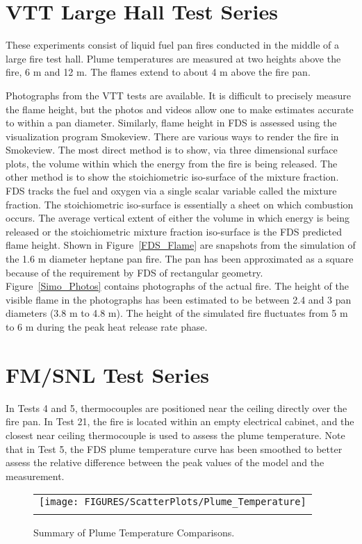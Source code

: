 \clearpage

\section{VTT Large Hall Test Series}

These experiments consist of liquid fuel pan fires conducted in the middle of a large fire test hall.
Plume temperatures are measured at two heights above the fire, 6 m and 12 m.
The flames extend to about 4 m above the fire pan.

Photographs from the VTT tests are available. It is difficult to precisely measure the flame height,
but the photos and videos allow one to make estimates accurate to within a pan diameter.
Similarly, flame height in FDS is assessed using the visualization program Smokeview.
There are various ways to render the fire in Smokeview.  The
most direct method is to show, via three dimensional surface plots, the volume within which the energy from the fire is being released.
The other method is to show the stoichiometric iso-surface of the mixture fraction.
FDS tracks the fuel and oxygen via a single scalar variable called the mixture fraction.
The stoichiometric iso-surface is essentially a sheet on which combustion occurs.  The average vertical extent of either the volume
in which energy is being released or the stoichiometric mixture fraction iso-surface is the FDS predicted flame height.
Shown in Figure~\ref{FDS_Flame} are snapshots from the simulation of the 1.6 m diameter heptane pan fire.
The pan has been approximated as a square because of the requirement by FDS of rectangular geometry.
Figure~\ref{Simo_Photos} contains photographs of the actual fire.
The height of the visible flame in the photographs has been estimated to be between 2.4 and 3 pan diameters (3.8 m to 4.8 m).
The height of the simulated fire fluctuates from 5 m to 6 m during the peak heat release rate phase.


\section{FM/SNL Test Series}

In Tests 4 and 5, thermocouples are positioned near the ceiling directly over the fire pan.
In Test 21, the fire is located within an empty electrical cabinet, and the closest near ceiling thermocouple
is used to assess the plume temperature.  Note that in Test 5, the FDS plume temperature curve has been smoothed
to better assess the relative difference between the peak values of the model and the measurement.




\begin{figure}[p]
\begin{center}
\begin{tabular}{c}
\texttt{[image: FIGURES/ScatterPlots/Plume\_Temperature]} \\
\vspace{0.25in} \\
\end{tabular}
\caption{Summary of Plume Temperature Comparisons.}
\end{center}
\label{Plume_Summary}
\end{figure}
\clearpage
